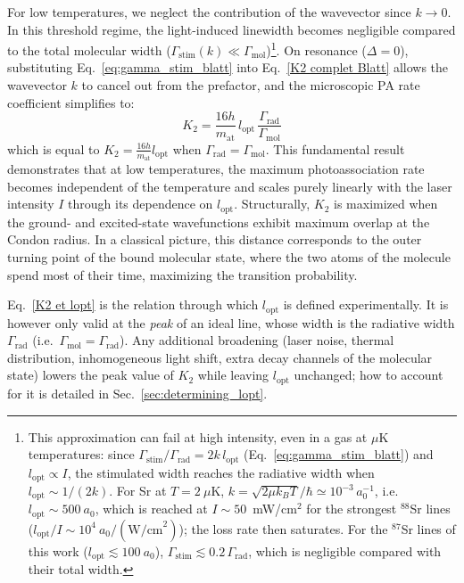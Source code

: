 For low temperatures, we neglect the contribution of the wavevector since $k \to 0$. In this threshold regime, the light-induced linewidth becomes negligible compared to the total molecular width
($\Gamma_{\text{stim}}(k) \ll \Gamma_{\text{mol}}$)\footnote{This approximation can fail at high intensity, even in a gas at $\mu$K temperatures: since $\Gamma_{\text{stim}}/\Gamma_{\text{rad}}=2k\,l_{\text{opt}}$ (Eq.~\ref{eq:gamma_stim_blatt}) and $l_{\text{opt}}\propto I$, the stimulated width reaches the radiative width when $l_{\text{opt}}\sim1/(2k)$. For Sr at $T=2~\mu$K, $k=\sqrt{2\mu k_BT}/\hbar\simeq10^{-3}\,a_0^{-1}$, i.e. $l_{\text{opt}}\sim500~a_0$, which is reached at $I\sim50$~mW/cm$^2$ for the strongest $^{88}$Sr lines ($l_{\text{opt}}/I\sim10^4~a_0/(\text{W/cm}^2)$); the loss rate then saturates. For the $^{87}$Sr lines of this work ($l_{\text{opt}}\lesssim100~a_0$), $\Gamma_{\text{stim}}\lesssim0.2\,\Gamma_{\text{rad}}$, which is negligible compared with their total width.}. On resonance ($\Delta = 0$), substituting Eq.~\ref{eq:gamma_stim_blatt} into Eq.~\ref{K2 complet Blatt} allows the wavevector $k$ to cancel out from the 
prefactor, and the microscopic PA rate coefficient simplifies to:
\begin{equation}
    K_2 = \frac{16h}{m_{\text{at}}}\,l_{\text{opt}}\,\frac{\Gamma_{\text{rad}}}{\Gamma_{\text{mol}}}
    \label{K2 et lopt}
\end{equation}
which is equal to $K_2 = \frac{16h}{m_{\text{at}}}l_{\text{opt}}$ when $\Gamma_{\text{rad}} = \Gamma_{\text{mol}}$.
This fundamental result demonstrates that at low temperatures, the maximum photoassociation rate becomes independent of the temperature and scales purely linearly with the laser intensity $I$ through its dependence 
on $l_{\text{opt}}$. Structurally, $K_2$ is maximized when the ground- and excited-state wavefunctions exhibit maximum overlap at the Condon radius. In a classical picture, this distance corresponds to the outer turning point of the bound
molecular state, where the two atoms of the molecule spend most of their time, maximizing the
transition probability.

Eq.~\ref{K2 et lopt} is the relation through which $l_{\text{opt}}$ is defined
experimentally. It is however only valid at the \textit{peak} of an ideal line,
whose width is the radiative width $\Gamma_{\text{rad}}$ (i.e.\ $\Gamma_{\text{mol}}=\Gamma_{\text{rad}}$). Any additional broadening
(laser noise, thermal distribution, inhomogeneous light shift, extra decay
channels of the molecular state) lowers the peak value of $K_2$ while leaving
$l_{\text{opt}}$ unchanged; how to account for it is detailed in
Sec.~\ref{sec:determining_lopt}.

